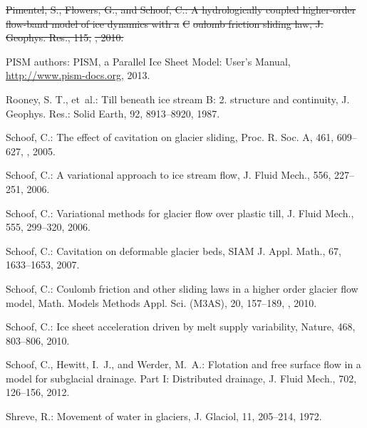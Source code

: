 \documentclass[gmd]{copernicus}   %
\providecommand{\DIFdel}[1]{{\protect\color{red}\sout{#1}}}                      %
\providecommand{\DIFdelend}{} %
\begin{document}
\begin{thebibliography}{}
\DIFdel{Pimentel, S., Flowers, G., and Schoof, C.: A hydrologically coupled
  higher-order flow-band model of ice dynamics with a }%
\DIFdel{C}%
\DIFdel{oulomb friction
  sliding law, J. Geophys. Res., 115, }%
\DIFdel{, 2010.
}%

\DIFdelend {}
{PISM authors}: {PISM}, a {P}arallel {I}ce {S}heet {M}odel: {U}ser's {M}anual,
  \url{http://www.pism-docs.org}, 2013.

Rooney, S. T., et~al.: Till beneath ice stream {B}: 2. structure and continuity,
  J. Geophys. Res.: Solid Earth, 92, 8913--8920, 1987.

Schoof, C.: The effect of cavitation on glacier sliding, Proc. R. Soc. A, 461,
  609--627, , 2005.

Schoof, C.: A variational approach to ice stream flow, J. Fluid Mech., 556,
  227--251, 2006{}.

Schoof, C.: Variational methods for glacier flow over plastic till, J. Fluid
  Mech., 555, 299--320, 2006{}.

Schoof, C.: Cavitation on deformable glacier beds, SIAM J. Appl. Math., 67,
  1633--1653, 2007.

Schoof, C.: Coulomb friction and other sliding laws in a higher order glacier
  flow model, Math. Models Methods Appl. Sci. (M3AS), 20, 157--189,
  , 2010{}.

Schoof, C.: Ice sheet acceleration driven by melt supply variability, Nature,
  468, 803--806, 2010{}.

Schoof, C., Hewitt, I.~J., and Werder, M.~A.: Flotation and free surface flow
  in a model for subglacial drainage. {P}art {I}: {D}istributed drainage, J.
  Fluid Mech., 702, 126--156, 2012.

Shreve, R.: Movement of water in glaciers, J. Glaciol, 11, 205--214, 1972.


\end{thebibliography}
\end{document}
